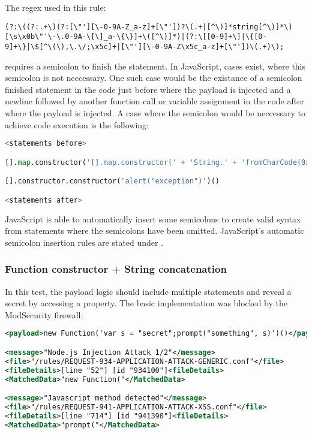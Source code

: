 The regex used in this rule:

\begin{lstlisting}[style=basicStyle]
(?:\((?:.+\)(?:[\"'][\-0-9A-Z_a-z]+[\"'])?\(.+|[^\)]*string[^\)]*\)[\s\x0b\"'\-\.0-9A-\[\]_a-\{\}]+\([^\)]*)|(?:\[[0-9]+\]|\{[0-9]+\}|\$[^\(\),\.\/;\x5c]+|[\"'][\-0-9A-Z\x5c_a-z]+[\"'])\(.+)\);
\end{lstlisting}

requires a semicolon to finish the statement. In JavaScript, cases exist, where this semicolon is not neccessary. One such case would be the existance of a semicolon finished statement in the code just before where the payload is injected and a newline followed by another function call or variable assignment in the code after where the payload is injected. A case where the semicolon would be neccessary to achieve code execution is the following:

\begin{lstlisting}[style=basicStyle, language=Python]
<statements before>

[].map.constructor('[].map.constructor(' + 'String.' + 'fromCharCode(0x61,108,0x65,114,116,0x28,96,120,115,115,0x60,0x29)' + ')();')()

[].constructor.constructor('alert("exception")')()

<statements after>
\end{lstlisting}

JavaScript is able to automatically insert some semicolons to create valid syntax from statements where the semicolons have been omitted. JavaScript's automatic semicolon insertion rules are stated under \cite{js/autosemi}.





\subsubsection{Function constructor + String concatenation}
\label{sec:funconstrconbypass}
In this test, the payload logic should include multiple statements and reveal a secret by accessing a property.
The basic implementation was blocked by the ModSecurity firewall:

\begin{lstlisting}[style=ruleStyle, language=XML, caption=function constructor blocked, label={lst:funconblocked}]
<payload>new Function('var s = "secret";prompt("something", s)')()</payload>

<message>"Node.js Injection Attack 1/2"</message>
<file>"/rules/REQUEST-934-APPLICATION-ATTACK-GENERIC.conf"</file>
<fileDetails>[line "52"] [id "934100"]<fileDetails>
<MatchedData>"new Function("</MatchedData>

<message>"Javascript method detected"</message>
<file>"/rules/REQUEST-941-APPLICATION-ATTACK-XSS.conf"</file>
<fileDetails>[line "714"] [id "941390"]<fileDetails>
<MatchedData>"prompt("</MatchedData>
\end{lstlisting}


